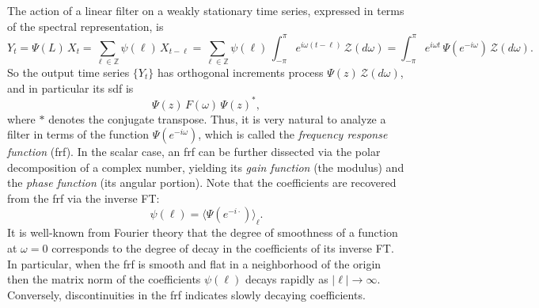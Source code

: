 \documentclass[a4paper]{book}
\def\ZZ{\mathbb Z}
\def\tends{\rightarrow}
\begin{document}
 The action of   a linear  filter
 on a weakly stationary time series,
 expressed in terms of the spectral representation, is
\[
  Y_t = \Psi (L) \, X_t = \sum_{\ell \in \ZZ} \psi (\ell) \, X_{t-\ell}
   = \sum_{\ell \in \ZZ} \psi (\ell)
  \, \int_{-\pi}^{\pi} e^{i \omega (t-\ell)} \,
   \mathcal{Z} (d\omega) =
  \int_{-\pi}^{\pi} e^{i \omega t} \, \Psi (e^{-i \omega}) \,
   \mathcal{Z} (d\omega).
\]
 So the output time series $\{ Y_t \}$ has orthogonal increments process
  $\Psi (z) \, \mathcal{Z} (d\omega)$, and in particular its sdf is
\[  
   \Psi (z) \, F(\omega) \, { \Psi (z) }^{*},
\]
 where $*$ denotes the conjugate transpose.  Thus, it is very natural
 to analyze a filter in terms of the function $\Psi (e^{-i \omega})$,
 which is called the {\em frequency response function} (frf).  In 
 the scalar case, an frf can be further dissected via the polar 
 decomposition of a complex number, yielding its {\em gain function}
 (the modulus) and the {\em phase function} (its angular portion).  
  Note that the coefficients are recovered from the frf via the inverse FT:
\[
  \psi (\ell) = {\langle \Psi (e^{-i \cdot } ) \rangle }_{\ell}.
\]
  It is well-known from Fourier theory that the degree of smoothness of a
 function at $\omega = 0$ corresponds to the degree of decay in the coefficients 
 of its  inverse FT.  In particular, when the frf is smooth and flat in a
 neighborhood of the origin then the matrix norm of the 
 coefficients $\psi (\ell)$ decays rapidly as $|\ell| \tends \infty$.  Conversely,
 discontinuities in the frf indicates slowly decaying coefficients.
\end{document}
